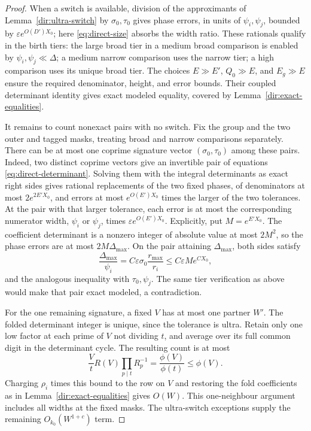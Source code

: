 \begin{proof}
When a switch is available, division of the approximants of
Lemma~\ref{dir:ultra-switch} by $\sigma_0,\tau_0$ gives phase errors,
in units of $\psi_i,\psi_j$, bounded by
$\varepsilon e^{O(D')X_0}$; here
\eqref{eq:direct-size} absorbs the width ratio. These rationals qualify
in the birth tiers: the large broad tier in a medium broad comparison
is enabled by $\psi_i,\psi_j\ll\Delta$; a medium narrow comparison uses
the narrow tier; a high comparison uses its unique broad tier.
The choices $E\gg E'$, $Q_0\gg E$, and $E_g\gg E$ ensure the required
denominator, height, and error bounds. Their coupled determinant
identity gives exact modeled equality, covered by
Lemma~\ref{dir:exact-equalities}.

It remains to count nonexact pairs with no switch. Fix the group and the
two outer and tagged masks, treating broad and narrow comparisons
separately. There can be at most one coprime signature vector
$(\sigma_0,\tau_0)$ among these pairs. Indeed, two distinct coprime
vectors give an invertible pair of equations
\eqref{eq:direct-determinant}. Solving them with the integral
determinants as exact right sides gives rational replacements of the
two fixed phases, of denominators at most $2e^{2E'X_0}$, and errors
at most $e^{O(E')X_0}$ times the larger of the two tolerances.
At the pair with that larger tolerance, each error is at most the
corresponding numerator width, $\psi_i$ or $\psi_j$, times
$\varepsilon e^{O(E')X_0}$. Explicitly, put $M=e^{E'X_0}$.
The coefficient determinant is a nonzero integer of absolute value
at most $2M^2$, so the phase errors are at most $2M\Delta_{\max}$.
On the pair attaining $\Delta_{\max}$, both sides satisfy
\[
 \frac{\Delta_{\max}}{\psi_i}
      =C\varepsilon\sigma_0\frac{r_{\max}}{r_i}
      \le C\varepsilon M e^{CX_0},
\]
and the analogous inequality with $\tau_0,\psi_j$.
The same tier verification as above would make
that pair exact modeled, a contradiction.

For the one remaining signature, a fixed $V$ has at most one partner
$W'$. The folded determinant integer is unique, since the tolerance is
ultra. Retain only one low factor at each prime of $V$ not dividing $t$,
and average over its full common digit in the determinant cycle. The
resulting count is at most
\[
 \frac{V}{t}R(V)\prod_{p\mid t}R_p^{-1}
       =\frac{\phi(V)}{\phi(t)}
       \le\phi(V).
\]
Charging $\rho_i$ times this bound to the row on $V$ and restoring the
fold coefficients as in Lemma~\ref{dir:exact-equalities} gives $O(W)$.
This one-neighbour argument includes all widths at the fixed masks.
The ultra-switch exceptions supply the remaining
$O_{k_0}(W^{1+c})$ term.
\end{proof}

